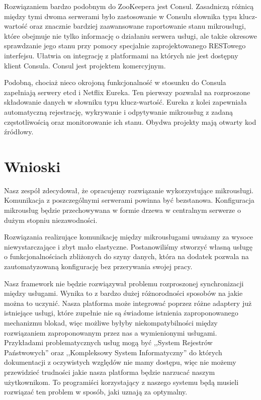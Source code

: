 \documentclass[licencjacka]{pracamgr}
\begin{document}
Rozwiązaniem bardzo podobnym do ZooKeepera jest Consul. Zasadniczą różnicą
między tymi dwoma serwerami było zastosowanie w Consulu słownika typu
klucz-wartość oraz znacznie bardziej zaawansowane raportowanie stanu
mikrousługi, które obejmuje nie tylko informację o działaniu serwera usługi,
ale także okresowe sprawdzanie jego stanu przy pomocy specjalnie
zaprojektowanego RESTowego interfejsu. Ułatwia on integrację z platformami na
których nie jest dostępny klient Consula. Consul jest projektem komercyjnym.

Podobną, chociaż nieco okrojoną funkcjonalność w stosunku do Consula zapełniają
serwery etcd i Netflix Eureka. Ten pierwszy pozwalał na rozproszone składowanie
danych w słowniku typu klucz-wartość. Eureka z kolei zapewniała automatyczną
rejestrację, wykrywanie i odpytywanie mikrousług z zadaną częstotliwością oraz
monitorowanie ich stanu. Obydwa projekty mają otwarty kod źródłowy.

\section{Wnioski}

Nasz zespół zdecydował, że opracujemy rozwiązanie wykorzystujące mikrousługi.
Komunikacja z poszczególnymi serwerami powinna być bezstanowa. Konfiguracja
mikrousług będzie przechowywana w formie drzewa w centralnym serwerze o dużym
stopniu niezawodności.

Rozwiązania realizujące komunikację między mikrousługami uważamy za wysoce
niewystarczające i zbyt mało elastyczne. Postanowiliśmy stworzyć własną usługę
o funkcjonalnościach zbliżonych do szyny danych, która na dodatek pozwala na
zautomatyzowaną konfigurację bez przerywania swojej pracy.

Nasz framework nie będzie rozwiązywał problemu rozproszonej synchronizacji między
usługami. Wynika to z bardzo dużej różnorodności sposobów na jakie można to uczynić.
Nasza platforma może integrować poprzez różne adaptery już istniejące usługi,
które zupełnie nie są świadome istnienia zaproponowanego mechanizmu blokad,
więc możliwe byłyby niekompatybilności między rozwiązaniem zaproponowanym
przez nas a wymienionymi usługami. Przykładami problematycznych usług mogą być
,,System Rejestrów Państwowych'' oraz ,,Kompleksowy System Informatyczny'' do
których dokumentacji z oczywistych względów nie mamy dostępu, więc nie możemy
przewidzieć trudności jakie nasza platforma będzie narzucać naszym użytkownikom.
To programiści korzystający z naszego systemu będą musieli rozwiązać ten problem
w sposób, jaki uznają za optymalny.
\end{document}
